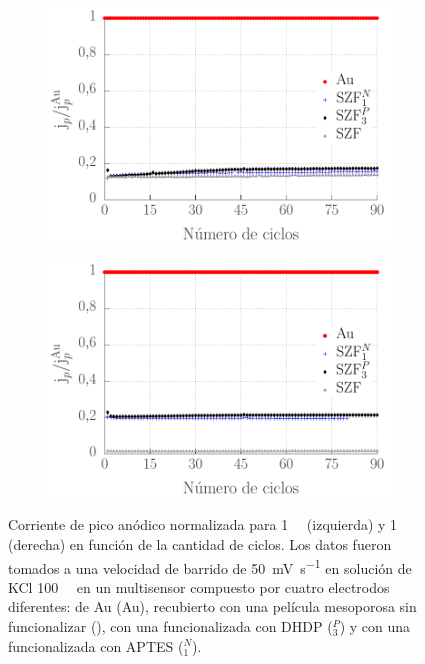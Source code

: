 			\begin{figure}[h!]
		 	\begin{subfigure}[t]{0.495\textwidth}
		 	  \includegraphics[trim=0 0 0 0.5cm,width=\textwidth]{Graficos/ciclosintferroceno.pdf}
		      \end{subfigure}
			\begin{subfigure}[t]{0.495\textwidth}
		 	    \includegraphics[trim=0 0 0 0.5cm,width=\textwidth]{Graficos/ciclosintfecn.pdf}
			\end{subfigure}
		      	\caption[Corriente de pico de \fc\space y \fe\space en función del número de ciclos]{Corriente de pico anódico normalizada para \fc\space \SI{1}{\milli\Molar} (izquierda) y  \fe\space \SI{1}{\milli\Molar} (derecha) en función de la cantidad de ciclos. Los datos fueron tomados a una velocidad de barrido de \SI{50}{\milli\volt\per\second} en solución de KCl \SI{100}{\milli\Molar} en un multisensor compuesto por cuatro electrodos diferentes: de Au (Au), recubierto con una película mesoporosa sin funcionalizar (\pdmZ), con una funcionalizada con DHDP (\pdmZ$^P_3$) y con una funcionalizada con APTES (\pdmZ$^N_1$).}
		      	\label{fig:ciclos-fe-fcoh}
		      	\end{figure}

